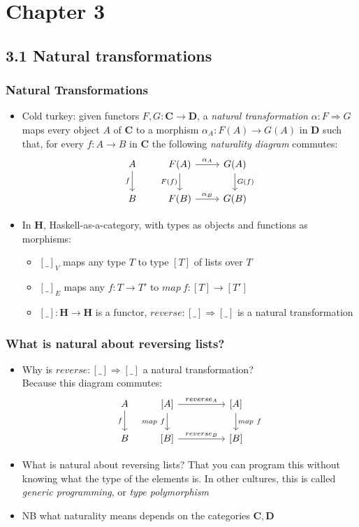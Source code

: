 \documentclass[handout]{beamer}
\title[INF223 presentations]{}
\newcommand{\To}{\Rightarrow}
\newcommand{\bfsf}[1]{{\boldsymbol{#1}}}
\newcommand{\CC}{\bfsf{C}}
\newcommand{\DD}{\bfsf{D}}
\newcommand{\HH}{\bfsf{H}}
\begin{document}
\section{Chapter 3}
\subsection{3.1 Natural transformations}
 
\frame
  {   
    \frametitle{Natural Transformations}\label{Ch3:NatTrans}

 \begin{itemize}[<+->]
\item Cold turkey: given functors $F,G: \CC\to\DD$, a \emph{natural transformation}
$\alpha: F\To G$ maps every object $A$ of $\CC$ to a morphism $\alpha_A : F(A)\to G(A)$
in $\DD$ such that, for every $f: A\to B$ in $\CC$ the following
\emph{naturality diagram} commutes:
\[
\begin{tikzcd}[ampersand replacement=\&]
A \arrow[swap]{d}{f} \& F(A)  \arrow[swap]{d}{F(f)}\arrow{r}{\alpha_A} \&\arrow{d}{G(f)} G(A)\\
B \& F(B)  \arrow{r}{\alpha_B} \& G(B)
\end{tikzcd}
\]
\item In $\HH$, Haskell-as-a-category, with types as objects and functions as morphisms:
   \begin{itemize}[<+->]
\item $[\_]_V$ maps any type $T$ to type $[T]$ of lists over $T$
\item $[\_]_E$ maps any $f: T\to T'$ to $map~f: [T] \to [T']$
\item $[\_]:\HH\to\HH$ is a functor, $reverse: [\_] \To [\_]$ is a natural transformation
   \end{itemize}
 \end{itemize}

 }

\frame
  {   
    \frametitle{What is natural about reversing lists?}\label{Ch3:reverse}

 \begin{itemize}[<+->]
\item Why is $reverse: [\_] \To [\_]$ a natural transformation?\\
Because this diagram commutes:
\[
\begin{tikzcd}[ampersand replacement=\&]
A \arrow[swap]{d}{f} \& {[A]}  \arrow[swap]{d}{map~f}\arrow{rr}{reverse_A} \&\& {[A]}\arrow{d}{map~f}\\
B \& {[B]}  \arrow{rr}{reverse_B}\& \& {[B]}
\end{tikzcd}
\]
\item What is natural about reversing lists?
That you can program this without knowing what the type of the elements is.
In other cultures, this is called \emph{generic programming},
or \emph{type polymorphism}
\item NB what naturality means depends on the categories $\CC,\DD$
 \end{itemize}

 }
\end{document}
